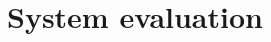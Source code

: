 \documentclass[
	paper=A4,
	titlepage=true,
	appendixprefix=true,
	headings=appendixwithoutprefixline,
	fontsize=11pt,
	parskip=half
]{scrreprt}
\begin{document}


	\chapter{System evaluation} {
	\label{ch:system_evaluation}
		
	}


	
	\renewcommand{\bibname}{References}
	\printbibliography[notcategory=exclude]

	
\end{document}
